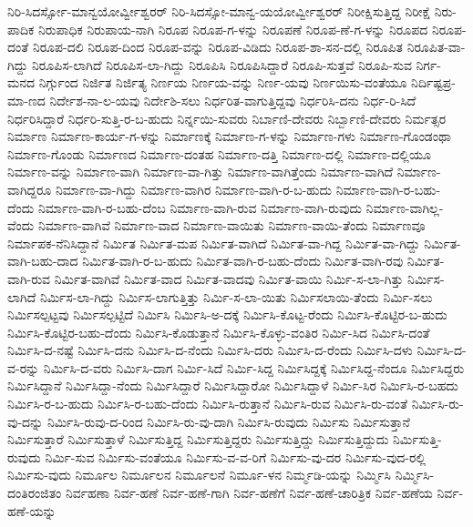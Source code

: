 ನಿರಿ-ಸಿದರ್ಸ್ಸೋ-ಮಾನ್ವಯೋರ್ವ್ವೀಶ್ವರರ್
ನಿರಿ-ಸಿದಸ್ಸೋ-ಮಾನ್ವ-ಯಯೋರ್ವ್ವೀಶ್ವರರ್
ನಿರೀಕ್ಷಿಸುತ್ತಿದ್ದ
ನಿರೀಕ್ಷೆ
ನಿರು-ಪಾದಿಕ
ನಿರುಪಾಧಿಕ
ನಿರುಪಾಯ-ನಾಗಿ
ನಿರೂಪ
ನಿರೂಪ-ಗ-ಳನ್ನು
ನಿರೂಪಣೆ
ನಿರೂಪ-ಣೆ-ಗ-ಳನ್ನು
ನಿರೂಪದ
ನಿರೂಪ-ದಂತೆ
ನಿರೂಪ-ದಲಿ
ನಿರೂಪ-ದಿಂದ
ನಿರೂಪ-ವನ್ನು
ನಿರೂಪ-ವಿಡಿದು
ನಿರೂಪ-ಶಾ-ಸನ-ದಲ್ಲಿ
ನಿರೂಪಿತ
ನಿರೂಪಿತ-ವಾ-ಗಿದ್ದು
ನಿರೂಪಿಸ-ಲಾಗಿದೆ
ನಿರೂಪಿಸ-ಲಾ-ಗಿದ್ದು
ನಿರೂಪಿಸಿ
ನಿರೂಪಿಸಿದ್ದಾರೆ
ನಿರೂಪಿ-ಸುತ್ತವೆ
ನಿರೂಪಿ-ಸುವ
ನಿರ್ಗ-ಮನದ
ನಿರ್ಗ್ಗುಂದ
ನಿರ್ಜಿತ
ನಿರ್ಜಿತ್ಯ
ನಿರ್ಣಯ
ನಿರ್ಣಯ-ವನ್ನು
ನಿರ್ಣ-ಯವು
ನಿರ್ಣಯಿಸು-ವಂತೆಯೂ
ನಿರ್ದಿಷ್ಟಪ್ರ-ಮಾ-ಣದ
ನಿರ್ದೇಶ-ನಾ-ಲ-ಯವು
ನಿರ್ದೇಶಿ-ಸಲು
ನಿರ್ಧರಿತ-ವಾಗುತ್ತಿದ್ದವು
ನಿರ್ಧರಿಸಿ-ದನು
ನಿರ್ಧ-ರಿ-ಸಿದೆ
ನಿರ್ಧರಿಸಿದ್ದಾರೆ
ನಿರ್ಧರಿ-ಸುತ್ತಿ-ರ-ಬ-ಹುದು
ನಿರ್ನ್ನಯಿ-ಸುವರು
ನಿರ್ಬಾಣಿ-ದೇವರು
ನಿರ್ಬ್ಬಾಣಿ-ದೇವರು
ನಿರ್ಮತ್ಸರ
ನಿರ್ಮಾಣ
ನಿರ್ಮಾಣ-ಕಾರ್ಯ-ಗ-ಳನ್ನು
ನಿರ್ಮಾಣಕ್ಕೆ
ನಿರ್ಮಾಣ-ಗ-ಳನ್ನು
ನಿರ್ಮಾಣ-ಗಳು
ನಿರ್ಮಾಣ-ಗೊಂಡಂಥಾ
ನಿರ್ಮಾಣ-ಗೊಂಡು
ನಿರ್ಮಾಣದ
ನಿರ್ಮಾಣ-ದಂತಹ
ನಿರ್ಮಾಣ-ದತ್ತಿ
ನಿರ್ಮಾಣ-ದಲ್ಲಿ
ನಿರ್ಮಾಣ-ದಲ್ಲಿಯೂ
ನಿರ್ಮಾಣ-ವನ್ನು
ನಿರ್ಮಾಣ-ವಾಗಿ
ನಿರ್ಮಾಣ-ವಾ-ಗಿತ್ತು
ನಿರ್ಮಾಣ-ವಾಗಿತ್ತೆಂದು
ನಿರ್ಮಾಣ-ವಾಗಿದೆ
ನಿರ್ಮಾಣ-ವಾಗಿದ್ದರೂ
ನಿರ್ಮಾಣ-ವಾ-ಗಿದ್ದು
ನಿರ್ಮಾಣ-ವಾಗಿರ
ನಿರ್ಮಾಣ-ವಾಗಿ-ರ-ಬ-ಹುದು
ನಿರ್ಮಾಣ-ವಾಗಿ-ರ-ಬಹು-ದೆಂದು
ನಿರ್ಮಾಣ-ವಾಗಿ-ರ-ಬಹು-ದೆಂಬ
ನಿರ್ಮಾಣ-ವಾಗಿ-ರುವ
ನಿರ್ಮಾಣ-ವಾಗಿ-ರುವುದು
ನಿರ್ಮಾಣ-ವಾಗಿಲ್ಲ-ವೆಂದು
ನಿರ್ಮಾಣ-ವಾಗಿವೆ
ನಿರ್ಮಾಣ-ವಾದ
ನಿರ್ಮಾಣ-ವಾಯಿತು
ನಿರ್ಮಾಣ-ವಾಯಿ-ತೆಂದು
ನಿರ್ಮಾಣವೂ
ನಿರ್ಮಾಪಕ-ನೆನಿಸಿದ್ದಾನೆ
ನಿರ್ಮಿತ
ನಿರ್ಮಿತ-ಮಪ
ನಿರ್ಮಿತ-ವಾಗಿದೆ
ನಿರ್ಮಿತ-ವಾ-ಗಿದ್ದ
ನಿರ್ಮಿತ-ವಾ-ಗಿದ್ದು
ನಿರ್ಮಿತ-ವಾಗಿ-ಬಹು-ದಾದ
ನಿರ್ಮಿತ-ವಾಗಿ-ರ-ಬ-ಹುದು
ನಿರ್ಮಿತ-ವಾಗಿ-ರ-ಬಹು-ದೆಂದು
ನಿರ್ಮಿತ-ವಾಗಿ-ರವು
ನಿರ್ಮಿತ-ವಾಗಿ-ರುವ
ನಿರ್ಮಿತ-ವಾಗಿವೆ
ನಿರ್ಮಿತ-ವಾದ
ನಿರ್ಮಿತ-ವಾದವು
ನಿರ್ಮಿತ-ವಾಯಿ
ನಿರ್ಮಿ-ಸ-ಲಾ-ಗಿತ್ತು
ನಿರ್ಮಿಸ-ಲಾಗಿದೆ
ನಿರ್ಮಿಸ-ಲಾ-ಗಿದ್ದು
ನಿರ್ಮಿಸ-ಲಾಗುತ್ತಿತ್ತು
ನಿರ್ಮಿ-ಸ-ಲಾ-ಯಿತು
ನಿರ್ಮಿಸಲಾಯಿ-ತೆಂದು
ನಿರ್ಮಿ-ಸಲು
ನಿರ್ಮಿಸಲ್ಪಟ್ಟವು
ನಿರ್ಮಿಸಲ್ಪಟ್ಟಿದೆ
ನಿರ್ಮಿಸಿ
ನಿರ್ಮಿಸಿ-ಅ-ದಕ್ಕೆ
ನಿರ್ಮಿಸಿ-ಕೊಟ್ಟ-ರೆಂದು
ನಿರ್ಮಿಸಿ-ಕೊಟ್ಟಿರ-ಬ-ಹುದು
ನಿರ್ಮಿಸಿ-ಕೊಟ್ಟಿರ-ಬಹು-ದೆಂದು
ನಿರ್ಮಿಸಿ-ಕೊಡುತ್ತಾನೆ
ನಿರ್ಮಿಸಿ-ಕೊಳ್ಳು-ವಂತಿರ
ನಿರ್ಮಿ-ಸಿದ
ನಿರ್ಮಿಸಿ-ದಂತೆ
ನಿರ್ಮಿಸಿ-ದ-ನಷ್ಟೆ
ನಿರ್ಮಿಸಿ-ದನು
ನಿರ್ಮಿಸಿ-ದ-ನೆಂದು
ನಿರ್ಮಿಸಿ-ದರು
ನಿರ್ಮಿಸಿ-ದ-ರೆಂದು
ನಿರ್ಮಿಸಿ-ದಳು
ನಿರ್ಮಿಸಿ-ದ-ವ-ರನ್ನು
ನಿರ್ಮಿಸಿ-ದ-ವರು
ನಿರ್ಮಿಸಿ-ದಾಗ
ನಿರ್ಮಿ-ಸಿದೆ
ನಿರ್ಮಿ-ಸಿದ್ದ
ನಿರ್ಮಿಸಿದ್ದಕ್ಕೆ
ನಿರ್ಮಿಸಿದ್ದ-ನೆಂದೂ
ನಿರ್ಮಿಸಿದ್ದರು
ನಿರ್ಮಿಸಿದ್ದಾನೆ
ನಿರ್ಮಿಸಿದ್ದಾ-ನೆಂದು
ನಿರ್ಮಿಸಿದ್ದಾರೆ
ನಿರ್ಮಿಸಿದ್ದಾರೋ
ನಿರ್ಮಿಸಿದ್ದಾಳೆ
ನಿರ್ಮಿ-ಸಿರ
ನಿರ್ಮಿಸಿ-ರ-ಬಹದು
ನಿರ್ಮಿಸಿ-ರ-ಬ-ಹುದು
ನಿರ್ಮಿಸಿ-ರ-ಬಹು-ದೆಂದು
ನಿರ್ಮಿಸಿ-ರುತ್ತಾನೆ
ನಿರ್ಮಿಸಿ-ರುವ
ನಿರ್ಮಿಸಿ-ರು-ವಂತೆ
ನಿರ್ಮಿಸಿ-ರು-ವು-ದನ್ನು
ನಿರ್ಮಿಸಿ-ರುವು-ದ-ರಿಂದ
ನಿರ್ಮಿಸಿ-ರು-ವು-ದಾಗಿ
ನಿರ್ಮಿಸಿ-ರುವುದು
ನಿರ್ಮಿಸು
ನಿರ್ಮಿಸುತ್ತಾನೆ
ನಿರ್ಮಿಸುತ್ತಾರೆ
ನಿರ್ಮಿಸುತ್ತಾಳೆ
ನಿರ್ಮಿಸುತ್ತಿದ್ದ
ನಿರ್ಮಿಸುತ್ತಿದ್ದರು
ನಿರ್ಮಿಸುತ್ತಿದ್ದು
ನಿರ್ಮಿಸುತ್ತಿದ್ದುದು
ನಿರ್ಮಿಸುತ್ತಿ-ರುವುದು
ನಿರ್ಮಿ-ಸುವ
ನಿರ್ಮಿಸು-ವಂತೆಯೂ
ನಿರ್ಮಿಸು-ವ-ವ-ರಿಗೆ
ನಿರ್ಮಿಸು-ವು-ದರ
ನಿರ್ಮಿಸು-ವುದ-ರಲ್ಲಿ
ನಿರ್ಮಿಸು-ವುದು
ನಿರ್ಮೂಲ
ನಿರ್ಮೂಲನ
ನಿರ್ಮೂಲನೆ
ನಿರ್ಮೂ-ಳನ
ನಿರ್ಮ್ಮಡಿ-ಯನ್ನು
ನಿರ್ಮ್ಮಿಸಿ
ನಿರ್ಮ್ಮಿಸಿ-ದಂತಿರಂಜಿತಂ
ನಿರ್ವಹಣಾ
ನಿರ್ವ-ಹಣೆ
ನಿರ್ವ-ಹಣೆ-ಗಾಗಿ
ನಿರ್ವ-ಹಣೆಗೆ
ನಿರ್ವ-ಹಣೆ-ಚಾರಿತ್ರಿಕ
ನಿರ್ವ-ಹಣೆಯ
ನಿರ್ವ-ಹಣೆ-ಯನ್ನು
